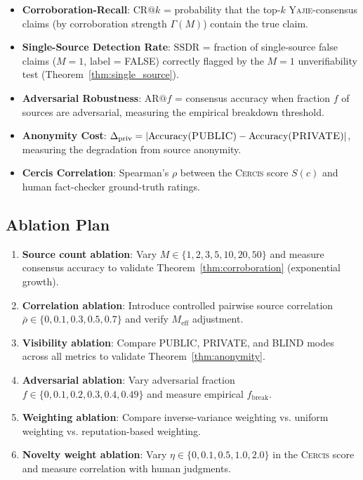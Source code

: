 \documentclass[11pt,a4paper]{article}
\theoremstyle{definition}
\newcommand{\Yajie}{\textsc{Yajie}}
\newcommand{\Cercis}{\textsc{Cercis}}
\newcommand{\VISpublic}{\textsc{PUBLIC}}
\newcommand{\VISprivate}{\textsc{PRIVATE}}
\newcommand{\VISblind}{\textsc{BLIND}}
\begin{document}
\begin{itemize}
    \item \textbf{Corroboration-Recall}: $\text{CR}@k$ = probability that the top-$k$ \Yajie{}-consensus claims (by corroboration strength $\Gamma(M)$) contain the true claim.
    \item \textbf{Single-Source Detection Rate}: $\text{SSDR}$ = fraction of single-source false claims ($M = 1$, label = FALSE) correctly flagged by the $M = 1$ unverifiability test (Theorem~\ref{thm:single_source}).
    \item \textbf{Adversarial Robustness}: $\text{AR}@f$ = consensus accuracy when fraction $f$ of sources are adversarial, measuring the empirical breakdown threshold.
    \item \textbf{Anonymity Cost}: $\Delta_{\mathrm{priv}} = |\text{Accuracy}(\VISpublic) - \text{Accuracy}(\VISprivate)|$, measuring the degradation from source anonymity.
    \item \textbf{Cercis Correlation}: Spearman's $\rho$ between the \Cercis{} score $S(c)$ and human fact-checker ground-truth ratings.
\end{itemize}

\subsection{Ablation Plan}

\begin{enumerate}[label=(\roman*)]
    \item \textbf{Source count ablation}: Vary $M \in \{1, 2, 3, 5, 10, 20, 50\}$ and measure consensus accuracy to validate Theorem~\ref{thm:corroboration} (exponential growth).
    \item \textbf{Correlation ablation}: Introduce controlled pairwise source correlation $\bar{\rho} \in \{0, 0.1, 0.3, 0.5, 0.7\}$ and verify $M_{\mathrm{eff}}$ adjustment.
    \item \textbf{Visibility ablation}: Compare \VISpublic{}, \VISprivate{}, and \VISblind{} modes across all metrics to validate Theorem~\ref{thm:anonymity}.
    \item \textbf{Adversarial ablation}: Vary adversarial fraction $f \in \{0, 0.1, 0.2, 0.3, 0.4, 0.49\}$ and measure empirical $f_{\mathrm{break}}$.
    \item \textbf{Weighting ablation}: Compare inverse-variance weighting vs. uniform weighting vs. reputation-based weighting.
    \item \textbf{Novelty weight ablation}: Vary $\eta \in \{0, 0.1, 0.5, 1.0, 2.0\}$ in the \Cercis{} score and measure correlation with human judgments.
\end{enumerate}
\end{document}
